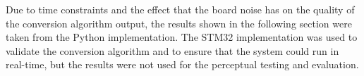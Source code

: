Due to time constraints and the effect that the board noise has on the quality of the conversion algorithm output, the results shown in the following section were taken from the Python implementation. The STM32 implementation was used to validate the conversion algorithm and to ensure that the system could run in real-time, but the results were not used for the perceptual testing and evaluation.